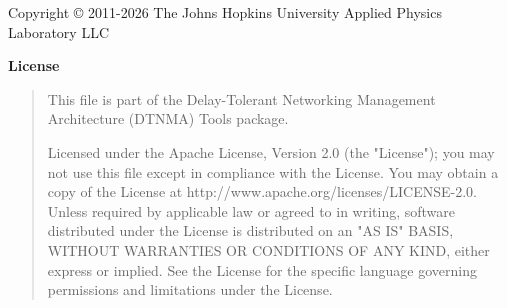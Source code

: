 \let\mypdfximage\pdfximage\def\pdfximage{\immediate\mypdfximage}\documentclass[twoside]{book}
\newcommand{\+}{\discretionary{\mbox{\scriptsize$\hookleftarrow$}}{}{}}
\newcommand{\clearemptydoublepage}{%
  \newpage{\pagestyle{empty}\cleardoublepage}%
}
\begin{document}
\raggedbottom

\hypersetup{pageanchor=false,
             bookmarksnumbered=true,
             pdfencoding=unicode
            }


\begin{titlepage}
\vspace*{7cm}
\begin{center}%
{\Large $projectbrief \\[1ex]\large $projectnumber }\\
\vspace*{1cm}
{\large  Prepared by The Johns Hopkins Applied Physics Laboratory}\\
\vspace*{1cm}
{\large Generated by Doxygen $doxygenversion}\\
\end{center}
\end{titlepage}

\noindent Copyright \textnormal{\copyright} 2011-2026 The Johns Hopkins University Applied Physics Laboratory LLC
\noindent\begin{center}\small\bfseries License \end{center}
\begin{quote}\small

This file is part of the Delay-Tolerant Networking Management
Architecture (DTNMA) Tools package.


Licensed under the Apache License, Version 2.0 (the "License"); you may not use this file except in compliance with the License.
You may obtain a copy of the License at http://www.apache.org/licenses/LICENSE-2.0. Unless required by applicable law or
agreed to in writing, software distributed under the License is distributed on an "AS IS" BASIS, WITHOUT WARRANTIES OR
CONDITIONS OF ANY KIND, either express or implied. See the License for the specific language governing permissions and
limitations under the License.
\end{quote}

\clearemptydoublepage
\tableofcontents

\clearemptydoublepage
{}
\hypersetup{pageanchor=true}

\end{document}
